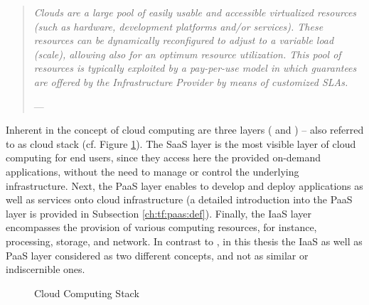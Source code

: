 \begin{quotation}{\slshape 
Clouds are a large pool of easily usable and accessible virtualized resources (such as hardware, development platforms and/or services). These resources can be dynamically reconfigured to adjust to a variable load (scale), allowing also for an optimum resource utilization. This pool of resources is typically exploited by a pay-per-use model in which guarantees are offered by the Infrastructure Provider by means of customized \acp{SLA}.}
\vspace*{-7pt}
\begin{flushright}
	--- \citealp[p. 51]{Vaquero2009}
\end{flushright}
\end{quotation}

Inherent in the concept of cloud computing are three layers (\citealp[pp. 118-119]{Iyer2010} and \citealp[pp. 2-3]{Mell2011}) -- also referred to as cloud stack (cf. Figure \ref{fig:ccs}). The \ac{SaaS} layer is the most visible layer of cloud computing for end users, since they access here the provided on-demand applications, without the need to manage or control the underlying infrastructure. Next, the \ac{PaaS} layer enables to develop and deploy applications as well as services onto cloud infrastructure (a detailed introduction into the \ac{PaaS} layer is provided in Subsection \ref{ch:tf:paas:def}). Finally, the \ac{IaaS} layer encompasses the provision of various computing resources, for instance, processing, storage, and network. In contrast to \citet[p. 50]{Armbrust2010}, in this thesis the \ac{IaaS} as well as \ac{PaaS} layer considered as two different concepts, and not as similar or indiscernible ones. 

\begin{figure}[tb]
	\centering
	
	\caption{Cloud Computing Stack}
	\label{fig:ccs}
\end{figure}

